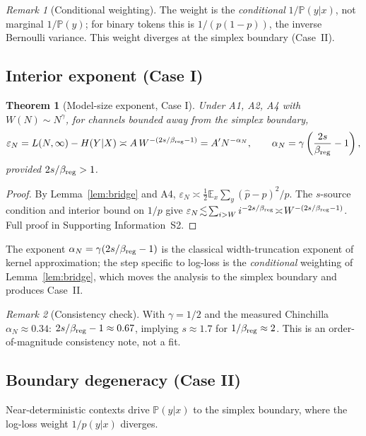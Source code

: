 \documentclass[12pt]{article}
\newcommand{\eps}{\varepsilon}
\newcommand{\E}{\mathbb{E}}
\newcommand{\Prob}{\mathbb{P}}
\newtheorem{theorem}{Theorem}[section]
\theoremstyle{remark}
\newtheorem{remark}{Remark}
\begin{document}
\begin{remark}[Conditional weighting]
\label{rem:conditional}
The weight is the \emph{conditional} $1/\Prob(y|x)$, not marginal
$1/\Prob(y)$; for binary tokens this is $1/(p(1-p))$, the inverse Bernoulli
variance.  This weight diverges at the simplex boundary (Case~II).
\end{remark}

\subsection{Interior exponent (Case I)}
\begin{theorem}[Model-size exponent, Case I]
\label{thm:modelN}
Under A1, A2, A4 with $W(N)\sim N^{\gamma}$, for channels bounded away from
the simplex boundary,
\begin{equation}
  \eps_N = L(N,\infty) - H(Y|X) \asymp A\, W^{-(2s/\beta_{\rm reg}-1)}
  = A' N^{-\alpha_N},
  \qquad \alpha_N=\gamma\left(\frac{2s}{\beta_{\rm reg}}-1\right),
  \label{eq:modelN}
\end{equation}
provided $2s/\beta_{\rm reg}>1$.
\end{theorem}

\begin{proof}
By Lemma~\ref{lem:bridge} and A4, $\eps_N\!\asymp\!\frac12\E_x\sum_y
(\hat p\!-\!p)^2/p$. The $s$-source condition and interior bound on $1/p$ give
$\eps_N\!\lesssim\!\sum_{i>W} i^{-2s/\beta_{\rm reg}}
\!\asymp\! W^{-(2s/\beta_{\rm reg}-1)}$.
Full proof in Supporting Information~S2.
\end{proof}

The exponent $\alpha_N=\gamma(2s/\beta_{\rm reg}-1)$ is the classical
width-truncation exponent of kernel approximation; the step specific to log-loss is
the \emph{conditional} weighting of Lemma~\ref{lem:bridge}, which moves the
analysis to the simplex boundary and produces Case~II.

\begin{remark}[Consistency check]
\label{rem:chinchilla}
With $\gamma=1/2$ and the measured Chinchilla $\alpha_N\approx0.34$:
$2s/\beta_{\rm reg}-1\approx0.67$, implying $s\approx1.7$ for
$1/\beta_{\rm reg}\approx2$. This is an order-of-magnitude consistency note, not a fit.
\end{remark}

\subsection{Boundary degeneracy (Case II)}
Near-deterministic contexts drive $\Prob(y|x)$ to the simplex boundary, where
the log-loss weight $1/p(y|x)$ diverges.
\end{document}
